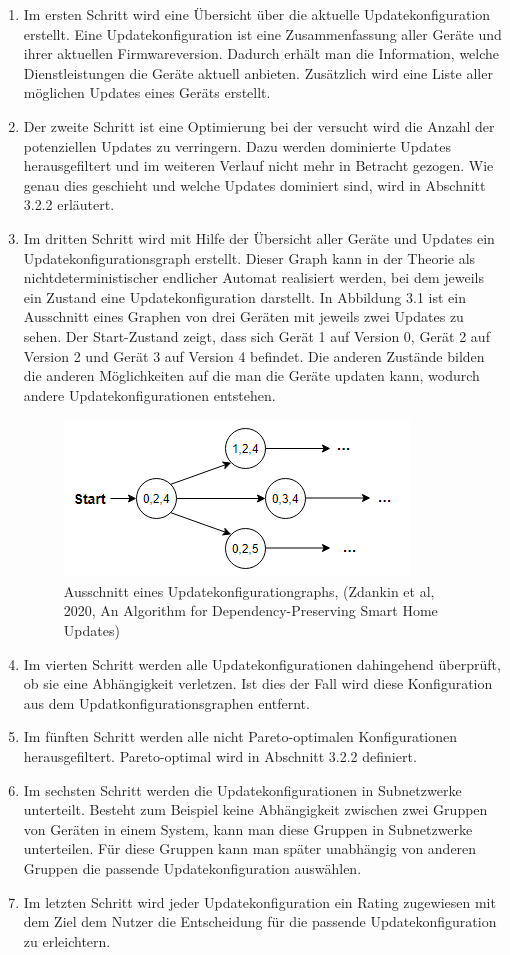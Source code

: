 \begin{enumerate}
\item Im ersten Schritt wird eine Übersicht über die aktuelle Updatekonfiguration erstellt. Eine Updatekonfiguration ist eine Zusammenfassung
aller Geräte und ihrer aktuellen Firmwareversion. Dadurch erhält man die Information, welche Dienstleistungen die Geräte aktuell anbieten.
Zusätzlich wird eine Liste aller möglichen Updates eines Geräts erstellt. 
\item Der zweite Schritt ist eine Optimierung bei der versucht wird die Anzahl der potenziellen Updates zu verringern. Dazu werden dominierte 
Updates herausgefiltert und im weiteren Verlauf nicht mehr in Betracht gezogen. Wie genau dies geschieht und welche Updates dominiert sind, wird
in Abschnitt 3.2.2 erläutert.
\item Im dritten Schritt wird mit Hilfe der Übersicht aller Geräte und Updates ein Updatekonfigurationsgraph erstellt. Dieser Graph kann in der
Theorie als nichtdeterministischer endlicher Automat realisiert werden, bei dem jeweils ein Zustand eine Updatekonfiguration darstellt. In Abbildung 3.1
ist ein Ausschnitt eines Graphen von drei Geräten mit jeweils zwei Updates zu sehen. Der Start-Zustand zeigt, dass sich Gerät 1 auf Version 0, Gerät 2 auf Version
2 und Gerät 3 auf Version 4 befindet. Die anderen Zustände bilden die anderen Möglichkeiten auf die man die Geräte updaten kann, wodurch andere
Updatekonfigurationen entstehen.

\begin{figure}[h]
\centering
\includegraphics{"images/UCG"}
\caption{Ausschnitt eines Updatekonfigurationgraphs, (Zdankin et al, 2020, An Algorithm for Dependency-Preserving Smart Home Updates) }
\label{fig:Prob1:MEA}
\end{figure}
\item Im vierten Schritt werden alle Updatekonfigurationen dahingehend überprüft, ob sie eine Abhängigkeit verletzen. Ist dies der Fall wird diese
Konfiguration aus dem Updatkonfigurationsgraphen entfernt.
\item Im fünften Schritt werden alle nicht Pareto-optimalen Konfigurationen herausgefiltert. Pareto-optimal wird in Abschnitt 3.2.2 definiert.
\item Im sechsten Schritt werden die Updatekonfigurationen in Subnetzwerke unterteilt. Besteht zum Beispiel keine Abhängigkeit zwischen zwei
Gruppen von Geräten in einem System, kann man diese Gruppen in Subnetzwerke unterteilen. Für diese Gruppen kann man später unabhängig von
anderen Gruppen die passende Updatekonfiguration auswählen.
\item Im letzten Schritt wird jeder Updatekonfiguration ein Rating zugewiesen mit dem Ziel dem Nutzer die Entscheidung für die passende
Updatekonfiguration zu erleichtern.
\end{enumerate}

